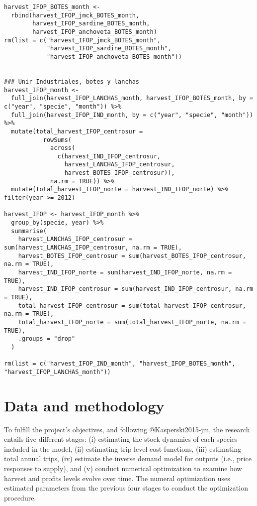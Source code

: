 \begin{verbatim}
harvest_IFOP_BOTES_month <- 
  rbind(harvest_IFOP_jmck_BOTES_month,
        harvest_IFOP_sardine_BOTES_month, 
        harvest_IFOP_anchoveta_BOTES_month)
rm(list = c("harvest_IFOP_jmck_BOTES_month", 
            "harvest_IFOP_sardine_BOTES_month", 
            "harvest_IFOP_anchoveta_BOTES_month"))


### Unir Industriales, botes y lanchas
harvest_IFOP_month <- 
  full_join(harvest_IFOP_LANCHAS_month, harvest_IFOP_BOTES_month, by = c("year", "specie", "month")) %>%
  full_join(harvest_IFOP_IND_month, by = c("year", "specie", "month")) %>%
  mutate(total_harvest_IFOP_centrosur = 
           rowSums(
             across(
               c(harvest_IND_IFOP_centrosur,
                 harvest_LANCHAS_IFOP_centrosur, 
                 harvest_BOTES_IFOP_centrosur)), 
             na.rm = TRUE)) %>%
  mutate(total_harvest_IFOP_norte = harvest_IND_IFOP_norte) %>% filter(year >= 2012)

harvest_IFOP <- harvest_IFOP_month %>%
  group_by(specie, year) %>%
  summarise(
    harvest_LANCHAS_IFOP_centrosur = sum(harvest_LANCHAS_IFOP_centrosur, na.rm = TRUE),
    harvest_BOTES_IFOP_centrosur = sum(harvest_BOTES_IFOP_centrosur, na.rm = TRUE),
    harvest_IND_IFOP_norte = sum(harvest_IND_IFOP_norte, na.rm = TRUE),
    harvest_IND_IFOP_centrosur = sum(harvest_IND_IFOP_centrosur, na.rm = TRUE),
    total_harvest_IFOP_centrosur = sum(total_harvest_IFOP_centrosur, na.rm = TRUE),
    total_harvest_IFOP_norte = sum(total_harvest_IFOP_norte, na.rm = TRUE),
    .groups = "drop"
  )

rm(list = c("harvest_IFOP_IND_month", "harvest_IFOP_BOTES_month", "harvest_IFOP_LANCHAS_month"))
\end{verbatim}

\hypertarget{data-and-methodology}{%
\section{Data and methodology}\label{data-and-methodology}}

To fulfill the project's objectives, and following @Kasperski2015-jm,
the research entails five different stages: (i) estimating the stock
dynamics of each species included in the model, (ii) estimating trip
level cost functions, (iii) estimating total annual trips, (iv) estimate
the inverse demand model for outputs (i.e., price responses to supply),
and (v) conduct numerical optimization to examine how harvest and
profits levels evolve over time. The numeral optimization uses estimated
parameters from the previous four stages to conduct the optimization
procedure.

